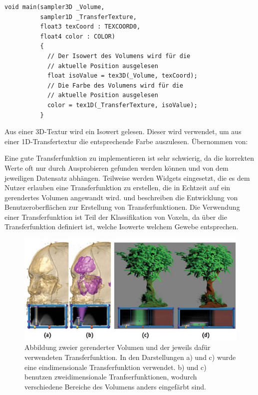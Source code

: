 \begin{listing}[!htb]
\begin{verbatim}
void main(sampler3D _Volume,
          sampler1D _TransferTexture,
          float3 texCoord : TEXCOORD0,
          float4 color : COLOR)
          {
          	// Der Isowert des Volumens wird für die 
          	// aktuelle Position ausgelesen
          	float isoValue = tex3D(_Volume, texCoord);
          	// Die Farbe des Volumens wird für die 
          	// aktuelle Position ausgelesen
          	color = tex1D(_TransferTexture, isoValue);
          }
\end{verbatim}
\caption{Aus einer 3D-Textur wird ein Isowert gelesen. Dieser wird verwendet, um aus einer 1D-Transfertextur die entsprechende Farbe auszulesen. Übernommen von: \cite{Fernando04}}
\label{lst:transfer}
\end{listing}
\FloatBarrier

Eine gute Transferfunktion zu implementieren ist sehr schwierig, da die korrekten Werte oft nur durch Ausprobieren gefunden werden können und von dem jeweiligen Datensatz abhängen. Teilweise werden Widgets eingesetzt, die es dem Nutzer erlauben eine Transferfunktion zu erstellen, die in Echtzeit auf ein gerendertes Volumen angewandt wird.
\cite{salama06} und \cite{Knig99} beschreiben die Entwicklung von Benutzeroberflächen zur Erstellung von Transferfunktionen.
Die Verwendung einer Transferfunktion ist Teil der Klassifikation von Voxeln, da über die Transferfunktion definiert ist, welche Isowerte welchem Gewebe entsprechen.

\begin{figure}[!htb]
	\centering
	\includegraphics[width=0.7\linewidth]{images/transferfunction.jpg}
	\caption{Abbildung zweier gerenderter Volumen und der jeweils dafür verwendeten Transferfunktion. In den Darstellungen a) und c) wurde eine eindimensionale Transferfunktion verwendet. b) und c) benutzen zweidimensionale Tranfserfunktionen, wodurch verschiedene Bereiche des Volumens anders eingefärbt sind.}
	\label{img:transferfunction}
\end{figure}
\FloatBarrier


